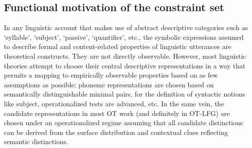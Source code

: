\documentclass[output=paper,hidelinks]{langscibook}
\begin{document}
\subsection{Functional motivation of the constraint set}
\label{sec:OT:functional-debate}

In any linguistic account that makes use of abstract descriptive categories such as `syllable', `subject', `passive', `quantifier', etc., the symbolic expressions assumed to describe formal and content-related properties of linguistic utterances are theoretical constructs. They are not directly observable. However, most linguistic theories attempt to choose their central descriptive representations in a way that permits a mapping to empirically observable properties based on as few assumptions as possible: phoneme representations are chosen based on semantically distinguishable minimal pairs, for the definition of syntactic notions like subject, operationalized tests are advanced, etc. In the same vein, the candidate representations in most OT work (and definitely in OT-LFG) are chosen under an operationalized regime assuming that all candidate distinctions can be derived from the surface distribution and contextual clues reflecting semantic distinctions. %
\end{document}
